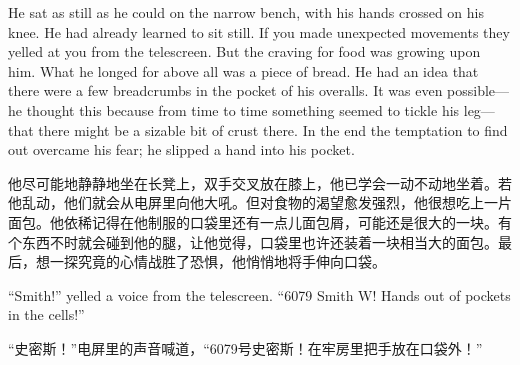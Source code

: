\begin{paracol}{2}
\switchcolumn*

He sat as still as he could on the narrow bench, with his hands crossed
on his knee. He had already learned to sit still. If you made unexpected
movements they yelled at you from the telescreen. But the craving for
food was growing upon him. What he longed for above all was a piece of
bread. He had an idea that there were a few breadcrumbs in the pocket of
his overalls. It was even possible---he thought this because from time
to time something seemed to tickle his leg---that there might be a
sizable bit of crust there. In the end the temptation to find out
overcame his fear; he slipped a hand into his pocket.

\switchcolumn

他尽可能地静静地坐在长凳上，双手交叉放在膝上，他已学会一动不动地坐着。若他乱动，他们就会从电屏里向他大吼。但对食物的渴望愈发强烈，他很想吃上一片面包。他依稀记得在他制服的口袋里还有一点儿面包屑，可能还是很大的一块。有个东西不时就会碰到他的腿，让他觉得，口袋里也许还装着一块相当大的面包。最后，想一探究竟的心情战胜了恐惧，他悄悄地将手伸向口袋。

\switchcolumn*

``Smith!'' yelled a voice from the telescreen. ``6079 Smith W! Hands out of
pockets in the cells!''

\switchcolumn

``史密斯！''电屏里的声音喊道，``6079号史密斯！在牢房里把手放在口袋外！''

\switchcolumn*


\end{paracol}
